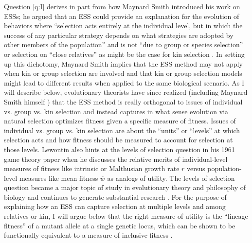 \documentclass[11pt]{article}
\newcommand{\mean}[1]{\overline{#1}}
\begin{document}
Question \ref{q:I} derives in part from how Maynard Smith introduced his work on ESSs; he argued that an ESS could provide an explanation for the evolution of behaviors where ``selection acts entirely at the individual level, but in which the success of any particular strategy depends on what strategies are adopted by other members of the population'' \cite[][p. 210]{Maynard-Smith:1974} and is not ``due to group or species selection'' \cite[p. 15]{Maynard-Smith:Price:1973} or selection on ``close relatives'' \cite[p. 210]{Maynard-Smith:1974} as might be the case for kin selection \cite{Hamilton:1964}. In setting up this dichotomy, Maynard Smith implies that the ESS method may not apply when kin or group selection are involved and that kin or group selection models might lead to different results when applied to the same biological scenario. As I will describe below, evolutionary theorists have since realized (including Maynard Smith himself \cite[p. 33]{MaynardSmith:1978}) that the ESS method is really orthogonal to issues of individual vs. group vs. kin selection and instead captures in what sense evolution via natural selection optimizes fitness given a specific measure of fitness. Issues of individual vs. group vs. kin selection are about the ``units'' or ``levels'' at which selection acts and how fitness should be measured to account for selection at those levels. Lewontin also hints at the levels of selection question in his 1961 game theory paper when he discusses the relative merits of individual-level measures of fitness like intrinsic or Malthusian growth rate $r$ versus population-level measures like mean fitness $\mean{w}$ \cite[p. 400-401]{Lewontin:1961} as analogs of utility. The levels of selection question became a major topic of study in evolutionary theory \cite[e.g.,][]{Lewontin:1970,Dawkins:1982,Wilson:Sober:1989,Maynard-Smith:Szathmary:1995,Wilson:1997,Michod:1999,Michod:2006,Szathmary:2015} and philosophy of biology \cite{Hull:1980,Brandon:1982,Damuth:Heisler:1988,Lloyd:1992,Lloyd:1994,Sober:Wilson:1994,Okasha:2006,Okasha:2016} and continues to generate substantial research \cite[e.g.,][]{Black:Bourrat:2020,Cooney:Mori:2022,Veit:2022}. For the purpose of explaining how an ESS can capture selection at multiple levels and among relatives or kin, I will argue below that the right measure of utility is the ``lineage fitness'' \cite{Lehmann:Alger:2015,Akcay:VanCleve:2016,Lehmann:Mullon:2016} of a mutant allele at a single genetic locus, which can be shown to be functionally equivalent to a measure of inclusive fitness \cite{Lehmann:Mullon:2016,Lehmann:Rousset:2020}.
\end{document}

